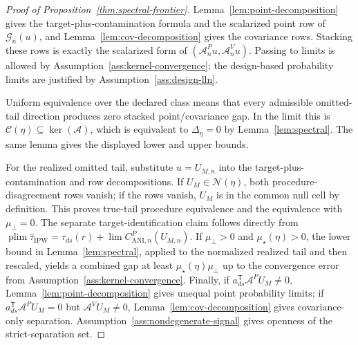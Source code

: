\documentclass[11pt]{article}
\newcommand{\transpose}{\mathsf{T}}
\newcommand{\plim}{\operatorname*{plim}}
\theoremstyle{definition}
\theoremstyle{plain}
\theoremstyle{remark}
\begin{document}
\begin{proof}[Proof of Proposition~\ref{thm:spectral-frontier}]
Lemma~\ref{lem:point-decomposition} gives the target-plus-contamination
formula and the scalarized point row of \(\mathcal G_n(u)\), and
Lemma~\ref{lem:cov-decomposition} gives the covariance rows.  Stacking these
rows is exactly the scalarized form of \((\mathcal A^P_nu,\mathcal A^V_nu)\).
Passing to limits is allowed by Assumption~\ref{ass:kernel-convergence}; the
design-based probability limits are justified by
Assumption~\ref{ass:design-lln}.

Uniform equivalence over the declared class means that every admissible
omitted-tail direction produces zero stacked point/covariance gap.  In the
limit this is \(\mathcal C(\eta)\subseteq\ker(\mathcal A)\), which is
equivalent to \(\Delta_\eta=0\) by Lemma~\ref{lem:spectral}.  The same lemma
gives the displayed lower and upper bounds.

For the realized omitted tail, substitute \(u=U_{M,n}\) into the
target-plus-contamination and row decompositions.  If
\(U_M\in\mathcal N(\eta)\), both procedure-disagreement rows vanish; if the
rows vanish, \(U_M\) is in the common null cell by definition.  This proves
true-tail procedure equivalence and the equivalence with \(\mu_\perp=0\).
The separate target-identification claim follows directly from
\(\plim\hat\tau_{\mathrm{IPW}}=\tau_{ds}(r)+
\lim C^P_{\mathrm{ANI},n}(U_{M,n})\).  If
\(\mu_\perp>0\) and \(\mu_\star(\eta)>0\), the lower bound in
Lemma~\ref{lem:spectral}, applied to the normalized realized tail and then
rescaled, yields a combined gap at least
\(\mu_\star(\eta)\mu_\perp\) up to the convergence error from
Assumption~\ref{ass:kernel-convergence}.  Finally, if
\(a_{ds}^{\transpose}\mathcal A^P U_M\ne0\),
Lemma~\ref{lem:point-decomposition} gives unequal point probability limits;
if \(a_{ds}^{\transpose}\mathcal A^P U_M=0\) but
\(\mathcal A^V U_M\ne0\), Lemma~\ref{lem:cov-decomposition} gives
covariance-only separation.  Assumption~\ref{ass:nondegenerate-signal} gives
openness of the strict-separation set.
\end{proof}
\end{document}
